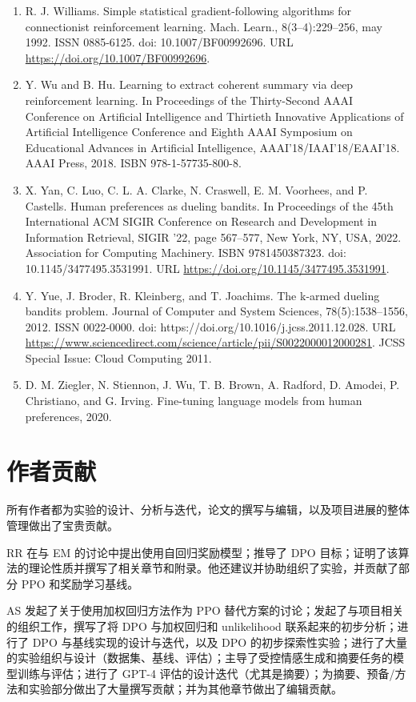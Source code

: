 \documentclass[11pt,UTF8,fontset=fandol]{ctexart}
\begin{document}
\begin{enumerate}[leftmargin=2.2em, itemsep=2pt]
\item R. J. Williams. Simple statistical gradient-following algorithms for connectionist reinforcement learning. Mach. Learn., 8(3--4):229--256, may 1992. ISSN 0885-6125. doi: 10.1007/BF00992696. URL \url{https://doi.org/10.1007/BF00992696}.
\item Y. Wu and B. Hu. Learning to extract coherent summary via deep reinforcement learning. In Proceedings of the Thirty-Second AAAI Conference on Artificial Intelligence and Thirtieth Innovative Applications of Artificial Intelligence Conference and Eighth AAAI Symposium on Educational Advances in Artificial Intelligence, AAAI'18/IAAI'18/EAAI'18. AAAI Press, 2018. ISBN 978-1-57735-800-8.
\item X. Yan, C. Luo, C. L. A. Clarke, N. Craswell, E. M. Voorhees, and P. Castells. Human preferences as dueling bandits. In Proceedings of the 45th International ACM SIGIR Conference on Research and Development in Information Retrieval, SIGIR '22, page 567--577, New York, NY, USA, 2022. Association for Computing Machinery. ISBN 9781450387323. doi: 10.1145/3477495.3531991. URL \url{https://doi.org/10.1145/3477495.3531991}.
\item Y. Yue, J. Broder, R. Kleinberg, and T. Joachims. The k-armed dueling bandits problem. Journal of Computer and System Sciences, 78(5):1538--1556, 2012. ISSN 0022-0000. doi: https://doi.org/10.1016/j.jcss.2011.12.028. URL \url{https://www.sciencedirect.com/science/article/pii/S0022000012000281}. JCSS Special Issue: Cloud Computing 2011.
\item D. M. Ziegler, N. Stiennon, J. Wu, T. B. Brown, A. Radford, D. Amodei, P. Christiano, and G. Irving. Fine-tuning language models from human preferences, 2020.
\end{enumerate}

\section*{作者贡献}

所有作者都为实验的设计、分析与迭代，论文的撰写与编辑，以及项目进展的整体管理做出了宝贵贡献。

RR 在与 EM 的讨论中提出使用自回归奖励模型；推导了 DPO 目标；证明了该算法的理论性质并撰写了相关章节和附录。他还建议并协助组织了实验，并贡献了部分 PPO 和奖励学习基线。

AS 发起了关于使用加权回归方法作为 PPO 替代方案的讨论；发起了与项目相关的组织工作，撰写了将 DPO 与加权回归和 unlikelihood 联系起来的初步分析；进行了 DPO 与基线实现的设计与迭代，以及 DPO 的初步探索性实验；进行了大量的实验组织与设计（数据集、基线、评估）；主导了受控情感生成和摘要任务的模型训练与评估；进行了 GPT-4 评估的设计迭代（尤其是摘要）；为摘要、预备/方法和实验部分做出了大量撰写贡献；并为其他章节做出了编辑贡献。
\end{document}
